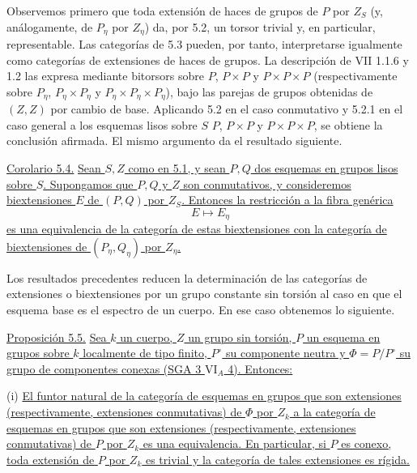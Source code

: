 Observemos primero que toda extensión de haces de grupos de $P$ por
$Z_S$ (y, análogamente, de $P_\eta$ por $Z_\eta$) da, por 5.2, un torsor
trivial y, en particular, representable. Las categorías de 5.3 pueden,
por tanto, interpretarse igualmente como categorías de extensiones de
haces de grupos. La descripción de VII 1.1.6 y 1.2 las expresa mediante
bitorsors sobre $P$, $P\times P$ y $P\times P\times P$
(respectivamente sobre $P_\eta$, $P_\eta\times P_\eta$ y
$P_\eta\times P_\eta\times P_\eta$), bajo las parejas de grupos
obtenidas de $(Z,Z)$ por cambio de base. Aplicando 5.2 en el caso
conmutativo y 5.2.1 en el caso general a los esquemas lisos sobre $S$
$P$, $P\times P$ y $P\times P\times P$, se obtiene la conclusión
afirmada. El mismo argumento da el resultado siguiente.

\medskip
\noindent\underline{Corolario 5.4.} \underline{Sean $S,Z$ como en
5.1, y sean $P,Q$ dos esquemas en grupos lisos sobre $S$. Supongamos
que $P,Q$ y $Z$ son conmutativos, y consideremos biextensiones $E$ de
$(P,Q)$ por $Z_S$. Entonces la restricción a la fibra genérica}
\[
 E\longmapsto E_\eta
\]
\underline{es una equivalencia de la categoría de estas biextensiones
con la categoría de biextensiones de $(P_\eta,Q_\eta)$ por $Z_\eta$.}


Los resultados precedentes reducen la determinación de las categorías
de extensiones o biextensiones por un grupo constante sin torsión al
caso en que el esquema base es el espectro de un cuerpo. En ese caso
obtenemos lo siguiente.

\medskip
\noindent\underline{Proposición 5.5.} \underline{Sea $k$ un cuerpo,
$Z$ un grupo sin torsión, $P$ un esquema en grupos sobre $k$ localmente
de tipo finito, $P^\circ$ su componente neutra y
$\Phi=P/P^\circ$ su grupo de componentes conexas (SGA 3
$\mathrm{VI}_A$ 4). Entonces:}

\smallskip
\noindent (i) \underline{El funtor natural de la categoría de esquemas
en grupos que son extensiones (respectivamente, extensiones
conmutativas) de $\Phi$ por $Z_k$ a la categoría de esquemas en grupos
que son extensiones (respectivamente, extensiones conmutativas) de $P$
por $Z_k$ es una equivalencia. En particular, si $P$ es conexo, toda
extensión de $P$ por $Z_k$ es trivial y la categoría de tales
extensiones es rígida.}

